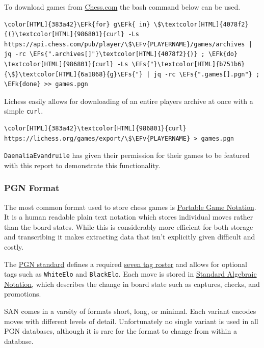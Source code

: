 \documentclass[11pt]{article}
\newcommand{\EFk}[1]{\textcolor{EFk}{#1}} %
\newcommand{\EFs}[1]{\textcolor{EFs}{#1}} %
\newcommand{\EFv}[1]{\textcolor{EFv}{#1}} %
\begin{document}
To download games from \href{https://www.chess.com/}{Chess.com} the bash command below can be used.
\begin{Code}
\begin{Verbatim}[]
\color[HTML]{383a42}\EFk{for} g\EFk{ in} \$\textcolor[HTML]{4078f2}{(}\textcolor[HTML]{986801}{curl} -Ls https://api.chess.com/pub/player/\$\EFv{PLAYERNAME}/games/archives | jq -rc \EFs{".archives[]"}\textcolor[HTML]{4078f2}{)} ; \EFk{do} \textcolor[HTML]{986801}{curl} -Ls \EFs{"}\textcolor[HTML]{b751b6}{\$}\textcolor[HTML]{6a1868}{g}\EFs{"} | jq -rc \EFs{".games[].pgn"} ; \EFk{done} >> games.pgn
\end{Verbatim}
\end{Code}

Lichess easily allows for downloading of an entire players archive at once with a simple \texttt{curl}.
\begin{Code}
\begin{Verbatim}[]
\color[HTML]{383a42}\textcolor[HTML]{986801}{curl} https://lichess.org/games/export/\$\EFv{PLAYERNAME} > games.pgn
\end{Verbatim}
\end{Code}

\texttt{DaenaliaEvandruile} has given their permission for their games to be featured with this report to demonstrate this functionality.
\subsubsection{PGN Format}
\label{sec:org062f263}
The most common format used to store chess games is \href{https://en.wikipedia.org/wiki/Portable\_Game\_Notation}{Portable Game Notation}. It is a human readable plain text notation which stores individual moves rather than the board states. While this is considerably more efficient for both storage and transcribing it makes extracting data that isn't explicitly given difficult and costly.

The \href{http://www.saremba.de/chessgml/standards/pgn/pgn-complete.htm}{PGN standard} defines a required \href{http://www.saremba.de/chessgml/standards/pgn/pgn-complete.htm\#c8.1.1}{seven tag roster} and allows for optional tags such as \texttt{WhiteElo} and \texttt{BlackElo}. Each move is stored in \href{https://en.wikipedia.org/wiki/Algebraic\_notation\_(chess)}{Standard Algebraic Notation}, which describes the change in board state such as captures, checks, and promotions.

SAN comes in a varsity of formats short, long, or minimal. Each variant encodes moves with different levels of detail. Unfortunately no single variant is used in all PGN databases, although it is rare for the format to change from within a database.
\end{document}
